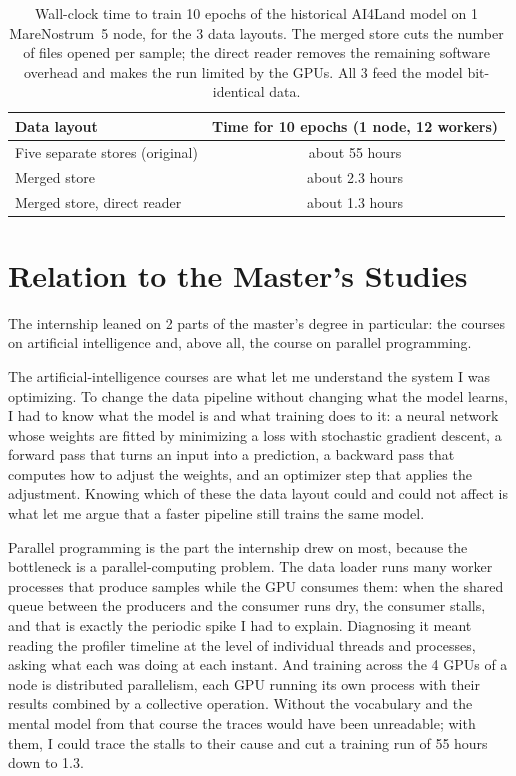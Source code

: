 \documentclass[12pt,a4paper]{article}
\begin{document}
\begin{table}[ht]
\centering
\begin{tabular}{lc}
\hline
\textbf{Data layout} & \textbf{Time for 10 epochs (1 node, 12 workers)}\\
\hline
Five separate stores (original) & about 55 hours\\
Merged store & about 2.3 hours\\
Merged store, direct reader & about 1.3 hours\\
\hline
\end{tabular}
\caption{Wall-clock time to train 10 epochs of the historical AI4Land model on 1 MareNostrum~5
node, for the 3 data layouts. The merged store cuts the number of files opened per sample;
the direct reader removes the remaining software overhead and makes the run limited by the GPUs.
All 3 feed the model bit-identical data.}
\label{tab:walltime}
\end{table}

\section{Relation to the Master's Studies}

The internship leaned on 2 parts of the master's degree in particular: the courses on artificial
intelligence and, above all, the course on parallel programming.

The artificial-intelligence courses are what let me understand the system I was optimizing. To
change the data pipeline without changing what the model learns, I had to know what the model is
and what training does to it: a neural network whose weights are fitted by minimizing a loss with
stochastic gradient descent, a forward pass that turns an input into a prediction, a backward pass
that computes how to adjust the weights, and an optimizer step that applies the adjustment. Knowing
which of these the data layout could and could not affect is what let me argue that a faster
pipeline still trains the same model.

Parallel programming is the part the internship drew on most, because the bottleneck is a
parallel-computing problem. The data loader runs many worker processes that produce samples while
the GPU consumes them: when the shared queue between the producers and the consumer runs dry, the
consumer stalls, and that is exactly the periodic spike I had to explain. Diagnosing it meant
reading the profiler timeline at the level of individual threads and processes, asking what each was
doing at each instant. And training across the 4 GPUs of a node is distributed parallelism, each GPU
running its own process with their results combined by a collective operation. Without the
vocabulary and the mental model from that course the traces would have been unreadable; with them, I
could trace the stalls to their cause and cut a training run of 55 hours down to 1.3.
\end{document}
